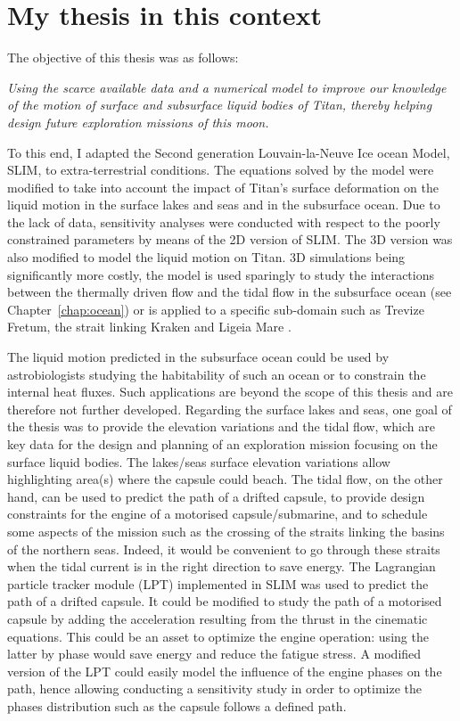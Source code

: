 \section*{My thesis in this context}
The objective of this thesis was as follows:\vspace{0.2cm}
\begin{adjustwidth}{25pt}{25pt}
\textit{Using the scarce available data and a numerical model to improve our knowledge of the motion of surface and subsurface liquid bodies of Titan, thereby helping design future exploration missions of this moon.}
\end{adjustwidth}
\vspace{0.1cm}
To this end, I adapted the Second generation Louvain-la-Neuve Ice ocean Model, SLIM, to extra-terrestrial conditions. The equations solved by the model were modified to take into account the impact of Titan's surface deformation on the liquid motion in the surface lakes and seas and in the subsurface ocean. Due to the lack of data, sensitivity analyses were conducted with respect to the poorly constrained parameters by means of the 2D version of SLIM. The 3D version was also modified to model the liquid motion on Titan. 3D simulations being significantly more costly, the model is used sparingly to study the interactions between the thermally driven flow and the tidal flow in the subsurface ocean (see Chapter~\ref{chap:ocean}) or is applied to a specific sub-domain such as Trevize Fretum, the strait linking Kraken and Ligeia Mare \citep[see][]{vincent2017study}. 

The liquid motion predicted in the subsurface ocean could be used by astrobiologists studying the habitability of such an ocean or to constrain the internal heat fluxes. Such applications are beyond the scope of this thesis and are therefore not further developed. Regarding the surface lakes and seas, one goal of the thesis was to provide the elevation variations and the tidal flow, which are key data for the design and planning of an exploration mission focusing on the surface liquid bodies. The lakes/seas surface elevation variations allow highlighting area(s) where the capsule could beach. The tidal flow, on the other hand, can be used to predict the path of a drifted capsule, to provide design constraints for the engine of a motorised capsule/submarine, and to schedule some aspects of the mission such as the crossing of the straits linking the basins of the northern seas. Indeed, it would be convenient to go through these straits when the tidal current is in the right direction to save energy. The Lagrangian particle tracker module (LPT) implemented in SLIM was used to predict the path of a drifted capsule. It could be modified to study the path of a motorised capsule by adding the acceleration resulting from the thrust in the cinematic equations. This could be an asset to optimize the engine operation: using the latter by phase would save energy and reduce the fatigue stress. A modified version of the LPT could easily model the influence of the engine phases on the path, hence allowing conducting a sensitivity study in order to optimize the phases distribution such as the capsule follows a defined path.

